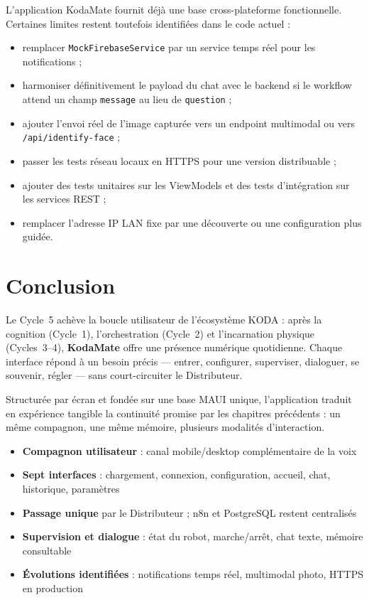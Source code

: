 \documentclass[a4paper,12pt]{report}
\begin{document}
	L'application KodaMate fournit déjà une base cross-plateforme fonctionnelle.
	Certaines limites restent toutefois identifiées dans le code actuel :
	\begin{itemize}
		\item remplacer \texttt{MockFirebaseService} par un service temps réel pour
		les notifications ;
		\item harmoniser définitivement le payload du chat avec le backend si le
		workflow attend un champ \texttt{message} au lieu de \texttt{question} ;
		\item ajouter l'envoi réel de l'image capturée vers un endpoint multimodal ou
		vers \texttt{/api/identify-face} ;
		\item passer les tests réseau locaux en HTTPS pour une version distribuable ;
		\item ajouter des tests unitaires sur les ViewModels et des tests
		d'intégration sur les services REST ;
		\item remplacer l'adresse IP LAN fixe par une découverte ou une configuration
		plus guidée.
	\end{itemize}
	
	\section{Conclusion}
	
	Le Cycle~5 achève la boucle utilisateur de l'écosystème KODA : après la
	cognition (Cycle~1), l'orchestration (Cycle~2) et l'incarnation physique
	(Cycles~3--4), \textbf{KodaMate} offre une présence numérique quotidienne.
	Chaque interface répond à un besoin précis --- entrer, configurer, superviser,
	dialoguer, se souvenir, régler --- sans court-circuiter le Distributeur.
	
	Structurée par écran et fondée sur une base MAUI unique, l'application traduit
	en expérience tangible la continuité promise par les chapitres précédents :
	un même compagnon, une même mémoire, plusieurs modalités d'interaction.
	
	\begin{tcolorbox}[colback=blue!5!white, colframe=blue!60!black,
		title=\textbf{Points clés du Cycle 5}]
		\begin{itemize}[noitemsep]
			\item \textbf{Compagnon utilisateur} : canal mobile/desktop complémentaire de la voix
			\item \textbf{Sept interfaces} : chargement, connexion, configuration, accueil, chat, historique, paramètres
			\item \textbf{Passage unique} par le Distributeur ; n8n et PostgreSQL restent centralisés
			\item \textbf{Supervision et dialogue} : état du robot, marche/arrêt, chat texte, mémoire consultable
			\item \textbf{Évolutions identifiées} : notifications temps réel, multimodal photo, HTTPS en production
		\end{itemize}
	\end{tcolorbox}
	
\end{document}

